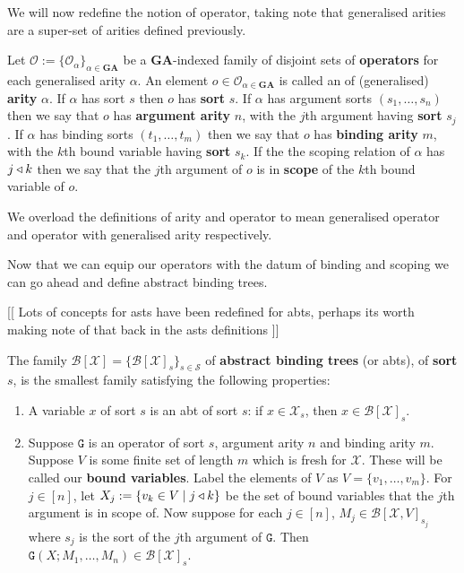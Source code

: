 We will now redefine the notion of operator, taking note that generalised arities are a super-set of arities defined previously.

\begin{defin}
    Let $\mathcal{O}:=\{ \mathcal{O}_\alpha\}_{\alpha \in \mathbf{GA}}$ be a $\mathbf{GA}$-indexed family of disjoint sets of \textbf{operators} for each generalised arity $\alpha$. An element $o \in \mathcal{O}_{\alpha \in \mathbf{GA}}$ is called an  of (generalised) \textbf{arity} $\alpha$. If $\alpha$ has sort $s$ then $o$ has \textbf{sort} $s$. If $\alpha$ has argument sorts $(s_1,\dots,s_n)$ then we say that $o$ has \textbf{argument arity} $n$, with the $j$th argument having \textbf{sort} $s_j$. If $\alpha$ has binding sorts $(t_1,\dots,t_m)$ then we say that $o$ has \textbf{binding arity} $m$, with the $k$th bound variable having \textbf{sort} $s_k$. If the the scoping relation of $\alpha$ has $j \triangleleft k$ then we say that the $j$th argument of $o$ is in \textbf{scope} of the $k$th bound variable of $o$. 
\end{defin}

\begin{remark}
    We overload the definitions of arity and operator to mean generalised operator and operator with generalised arity respectively.
\end{remark}

Now that we can equip our operators with the datum of binding and scoping we can go ahead and define abstract binding trees.

[[ Lots of concepts for asts have been redefined for abts,
perhaps its worth making note of that back in the asts definitions ]]

\begin{defin}\label{abt}
    The family $\mathcal{B}[\mathcal{X}] = \{ \mathcal{B}[\mathcal{X}]_s \}_{s \in \mathcal{S}}$ of \textbf{abstract binding trees} (or abts), of \textbf{sort} $s$, is the smallest family satisfying the following properties:
    
    \begin{enumerate}
        \item A variable $x$ of sort $s$ is an abt of sort $s$: if $x \in \mathcal{X}_s$, then $x \in \mathcal{B}[\mathcal{X}]_s$.
        \item Suppose $\mathtt{G}$ is an operator of sort $s$, argument arity $n$ and binding arity $m$. Suppose $V$ is some finite set of length $m$ which is fresh for $\mathcal{X}$. These will be called our \textbf{bound variables}. Label the elements of $V$ as $V= \{ v_1, \dots, v_m\}$. For $j\in [n]$, let $X_j:=\{ v_k \in V \mid j \triangleleft k\}$ be the set of bound variables that the $j$th argument is in scope of. Now suppose for each $j \in [n]$, $M_j \in \mathcal{B}[\mathcal{X},V]_{s_j}$ where $s_j$ is the sort of the $j$th argument of $\mathtt{G}$. Then $\mathtt{G}(X;M_1,\dots, M_n) \in \mathcal{B}[\mathcal{X}]_s$.
    \end{enumerate}
\end{defin}

